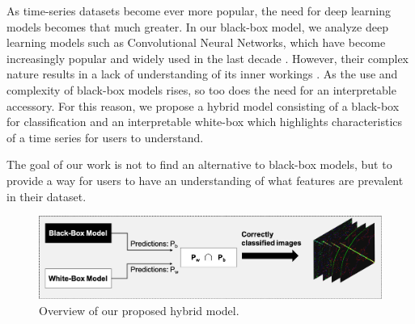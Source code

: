 \documentclass{turabian-thesis}[12pt]
\begin{document}
As time-series datasets become ever more popular, the need for deep learning models becomes that much greater. In our black-box model, we analyze deep learning models such as Convolutional Neural Networks, which have become increasingly popular and widely used in the last decade  \cite{cui_multi-scale_2016}. However, their complex nature results in a lack of understanding of its inner workings \cite{wang_hybrid_2019}.
As the use and complexity of black-box models rises, so too does the need for an interpretable accessory. For this reason, we propose a hybrid model consisting of a black-box for classification and an interpretable white-box which highlights characteristics of a time series for users to understand.

The goal of our work is not to find an alternative to black-box models, but to provide a way for users to have an understanding of what features are prevalent in their dataset.

\begin{figure}[h!]
   \begin{center}
      \includegraphics[scale=0.5]{../media/overview_model.png}
   \end{center}
   \caption{Overview of our proposed hybrid model.}
   \label{fig:overview_model}
\end{figure}

\end{document}
